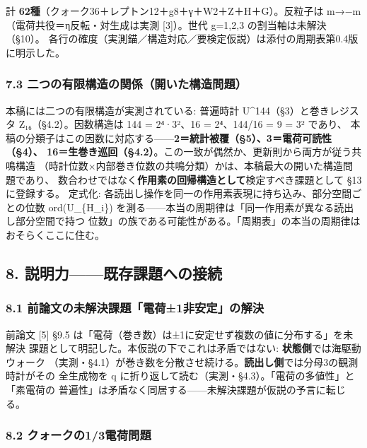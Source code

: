 \documentclass[
]{ltjsarticle}
\begin{document}
計 \textbf{62種}（クォーク36＋レプトン12＋g8＋γ＋W2＋Z＋H＋G）。反粒子は
m→−m （電荷共役＝η反転・対生成は実測 {[}3{]}）。世代 g=1,2,3
の割当軸は未解決（§10）。
各行の確度（実測錨／構造対応／要検定仮説）は添付の周期表第0.4版に明示した。

\subsubsection{7.3
二つの有限構造の関係（開いた構造問題）}\label{ux4e8cux3064ux306eux6709ux9650ux69cbux9020ux306eux95a2ux4fc2ux958bux3044ux305fux69cbux9020ux554fux984c}

本稿には二つの有限構造が実測されている: 普遍時計
U\^{}144（§3）と巻きレジスタ Z₁₆（§4.2）。因数構造は 144 = 2⁴·3²、16 =
2⁴、144/16 = 9 = 3² であり、
本稿の分類子はこの因数に対応する------\textbf{2＝統計被覆（§5）、3＝電荷可読性（§4）、
16＝生巻き巡回（§4.2）}。この一致が偶然か、更新則から両方が従う共鳴構造
（時計位数×内部巻き位数の共鳴分類）かは、本稿最大の開いた構造問題であり、
数合わせではなく\textbf{作用素の回帰構造として}検定すべき課題として §13
に登録する。 定式化:
各読出し操作を同一の作用素表現に持ち込み、部分空間ごとの位数
ord(U\textbar\_\{H\_i\})
を測る------本当の周期律は「同一作用素が異なる読出し部分空間で持つ
位数」の族である可能性がある。「周期表」の本当の周期律はおそらくここに住む。

\subsection{8.
説明力------既存課題への接続}\label{ux8aacux660eux529bux65e2ux5b58ux8ab2ux984cux3078ux306eux63a5ux7d9a}

\subsubsection{8.1
前論文の未解決課題「電荷±1非安定」の解決}\label{ux524dux8ad6ux6587ux306eux672aux89e3ux6c7aux8ab2ux984cux96fbux83771ux975eux5b89ux5b9aux306eux89e3ux6c7a}

前論文 {[}5{]} §9.5
は「電荷（巻き数）は±1に安定せず複数の値に分布する」を未解決
課題として明記した。本仮説の下でこれは矛盾ではない:
\textbf{状態側}では海駆動ウォーク
（実測・§4.1）が巻き数を分散させ続ける。\textbf{読出し側}では分母3の観測時計がその
全生成物を \textbar q
に折り返して読む（実測・§4.3）。「電荷の多値性」と「素電荷の
普遍性」は矛盾なく同居する------未解決課題が仮説の予言に転じる。

\subsubsection{8.2
クォークの1/3電荷問題}\label{ux30afux30a9ux30fcux30afux306e13ux96fbux8377ux554fux984c}
\end{document}
